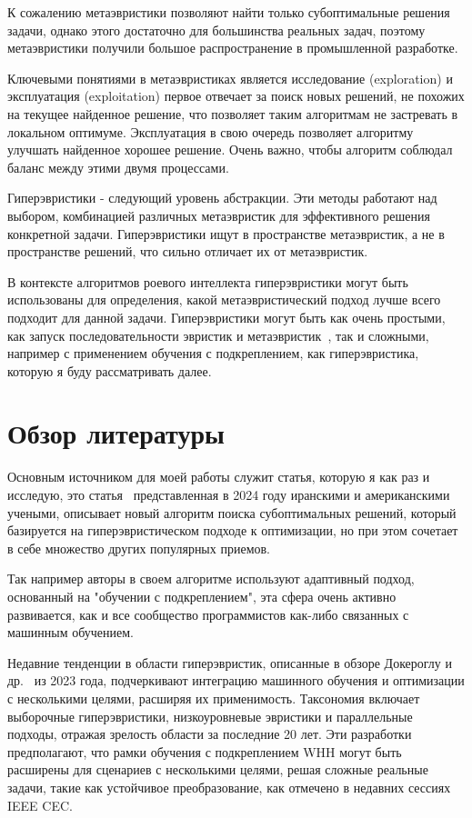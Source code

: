 \documentclass[a4paper,12pt]{extarticle}
\begin{document}
К сожалению метаэвристики позволяют найти только субоптимальные решения задачи, однако этого достаточно для большинства реальных задач, поэтому метаэвристики получили большое распространение в промышленной разработке. 

Ключевыми понятиями в метаэвристиках является исследование (exploration) и эксплуатация (exploitation) первое отвечает за поиск новых решений, не похожих на текущее найденное решение, что позволяет таким алгоритмам не застревать в локальном оптимуме. Эксплуатация в свою очередь позволяет алгоритму улучшать найденное хорошее решение. Очень важно, чтобы алгоритм соблюдал баланс между этими двумя процессами.

Гиперэвристики - следующий уровень абстракции. Эти методы работают над выбором, комбинацией различных метаэвристик для эффективного решения конкретной задачи. Гиперэвристики ищут в пространстве метаэвристик, а не в пространстве решений, что сильно отличает их от метаэвристик.

В контексте алгоритмов роевого интеллекта гиперэвристики могут быть использованы для определения, какой метаэвристический подход лучше всего подходит для данной задачи. Гиперэвристики могут быть как очень простыми, как запуск последовательности эвристик и метаэвристик~\cite{Thompson}, так и сложными, например с применением обучения с подкреплением, как гиперэвристика, которую я буду рассматривать далее.

\section{Обзор литературы}

Основным источником для моей работы служит статья, которую я как раз и исследую, это статья~\cite{WHH} представленная в 2024 году иранскими и американскими учеными, описывает новый алгоритм поиска субоптимальных решений, который базируется на гиперэвристическом подходе к оптимизации, но при этом сочетает в себе множество других популярных приемов.

Так например авторы в своем алгоритме используют адаптивный подход, основанный на "обучении с подкреплением", эта сфера очень активно развивается, как и все сообщество программистов как-либо связанных с машинным обучением. 

Недавние тенденции в области гиперэвристик, описанные в обзоре Докероглу и др.~\cite{taxonmy} из 2023 года, подчеркивают интеграцию машинного обучения и оптимизации с несколькими целями, расширяя их применимость. Таксономия включает выборочные гиперэвристики, низкоуровневые эвристики и параллельные подходы, отражая зрелость области за последние 20 лет. Эти разработки предполагают, что рамки обучения с подкреплением WHH могут быть расширены для сценариев с несколькими целями, решая сложные реальные задачи, такие как устойчивое преобразование, как отмечено в недавних сессиях IEEE CEC. 
\end{document}
